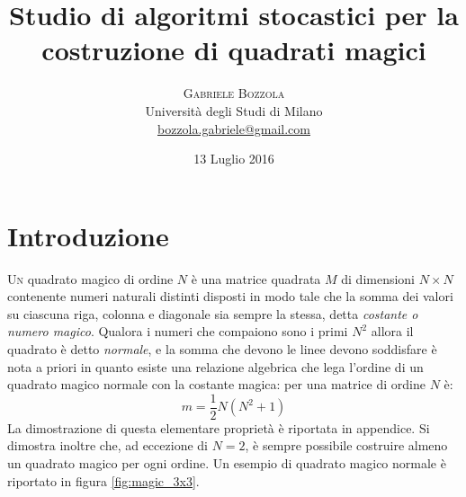 \documentclass[italian,twoside,twocolumn]{article}
\title{Studio di algoritmi stocastici per la costruzione di quadrati magici} %
\author{%
\textsc{Gabriele Bozzola} \\[1ex] %
\normalsize Università degli Studi di Milano \\ %
\normalsize \href{mailto:bozzola.gabriele@gmail.com}{bozzola.gabriele@gmail.com} %
}
\date{13 Luglio 2016} %
\begin{document}
\maketitle


\section{Introduzione}

\lettrine[nindent=0em,lines=3]{U}n quadrato magico di ordine $ N $ è una matrice quadrata  $ M $  di dimensioni $ N\times N $ contenente numeri naturali distinti disposti in modo tale che la somma dei valori su ciascuna riga, colonna e diagonale sia sempre la stessa, detta \emph{costante o numero magico}. Qualora i numeri che compaiono sono i primi $ N^2 $ allora il quadrato è detto \emph{normale}, e la somma che devono le linee devono soddisfare è nota a priori in quanto esiste una relazione algebrica che lega l'ordine di un quadrato magico normale con la costante magica: per una matrice di ordine $ N $ è:
\[	 \mathit{m} = \frac{1}{2} N (N^2 + 1)	\]
La dimostrazione di questa elementare proprietà è riportata in appendice. Si dimostra inoltre che, ad eccezione di $ N = 2 $, è sempre possibile costruire almeno un quadrato magico per ogni ordine. Un esempio di quadrato magico normale è riportato in figura \ref{fig:magic_3x3}.
\end{document}
